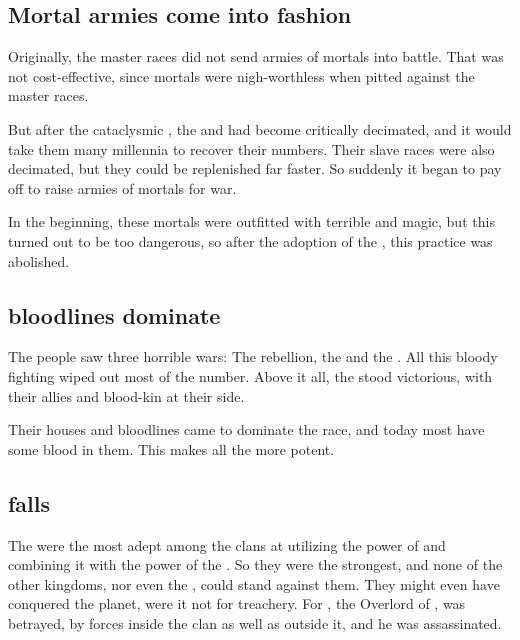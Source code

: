 \subsection{Mortal armies come into fashion}
Originally, the master races did not send armies of mortals into battle. That was not cost-effective, since mortals were nigh-worthless when pitted against the master races.  

But after the cataclysmic \secondbanewar, the \dragons{} and \resphain{} had become critically decimated, and it would take them many millennia to recover their numbers. Their slave races were also decimated, but they could be replenished far faster. So suddenly it began to pay off to raise armies of mortals for war. 

In the beginning, these mortals were outfitted with terrible  and magic, but this turned out to be too dangerous, so after the adoption of the , this practice was abolished. 









\subsection{\Sathariah{} bloodlines dominate}
The \resphan{} people saw three horrible wars: The rebellion, the \secondbanewar{} and the \resphanwars. 
All this bloody fighting wiped out most of the number. Above it all, the \satharioth{} stood victorious, with their allies and blood-kin at their side. 

Their houses and bloodlines came to dominate the \resphan{} race, and today most \resphain{} have some \sathariah{} blood in them. This makes  all the more potent. 










\subsection[Mystraacht falls]{\Mystraacht{} falls}
The \Mystraacht{} were the most adept among the clans at utilizing the power of \chaos{} and combining it with the \erebean{} power of the \banes. 
So they were the strongest, and none of the other \resphan{} kingdoms, nor even the \dragons, could stand against them. 
They might even have conquered the planet, were it not for treachery. 
For , the Overlord of \Mystraacht{}, was betrayed, by forces inside the clan as well as outside it, and he was assassinated. 





